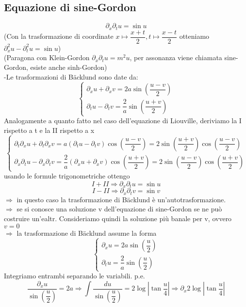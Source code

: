 \documentclass[a4paper,11pt]{report}
\newcommand{\Backlund}{B{\"a}cklund }
\begin{document}
\subsection{Equazione di sine-Gordon}
$$
\partial_x\partial_t u = \sin u
$$
(Con la trasformazione di coordinate $x \mapsto \dfrac{x+t}{2}, t\mapsto\dfrac{x-t}{2}$ otteniamo $\partial_x^2 u - \partial_t^2 u = \sin u$)\\
(Paragona con Klein-Gordon $\partial_x\partial_t u = m^2 u$, per assonanza viene chiamata sine-Gordon, esiste anche sinh-Gordon)\\
-Le trasformazioni di \Backlund sono date da:
$$
\left\{
\begin{matrix}
\partial_x u + \partial_x v = 2a \sin\left(\dfrac{u-v}{2}\right) \\
\partial_t u - \partial_t v = \dfrac{2}{a} \sin\left(\dfrac{u+v}{2}\right)
\end{matrix}
\right.
$$
Analogamente a quanto fatto nel caso dell'equazione di Liouville, deriviamo la I rispetto a t e la II rispetto a x
$$
\left\{
\begin{matrix}
\partial_t\partial_x u + \partial_t\partial_x v = a (\partial_t u - \partial_t v)\cos\left(\dfrac{u-v}{2}\right)=2\sin \left(\dfrac{u+v}{2}\right) \cos \left(\dfrac{u-v}{2}\right) \\
\partial_x\partial_t u - \partial_x\partial_t v = \dfrac{2}{a}(\partial_x u + \partial_x v)\cos\left(\dfrac{u+v}{2}\right)=2\sin\left(\dfrac{u-v}{2}\right)\cos\left(\dfrac{u+v}{2}\right)
\end{matrix}
\right.
$$
usando le formule trigonometriche ottengo
$$
I + II \Rightarrow \partial_x\partial_t u = \sin u
$$
$$
I-II \Rightarrow \partial_x\partial_t v=\sin v
$$
$\Rightarrow$ in questo caso la trasformazione di \Backlund è un'autotrasformazione.\\
$\Rightarrow$ se si conosce una soluzione v dell'equazione di sine-Gordon se ne può costruire un'ealtr. Consideriamo quindi la soluzione più banale per v, ovvero $v=0$\\
$\Rightarrow$ la trasformazione di \Backlund assume la forma
$$
\left\{
\begin{matrix}
\partial_x u = 2a\sin\left(\dfrac{u}{2}\right) \\
\partial_t u = \dfrac{2}{a}\sin\left(\dfrac{u}{2}\right)
\end{matrix}
\right.
$$
Integriamo entrambi separando le variabili. p.e.
$$
\dfrac{\partial_x u }{\sin\left(\dfrac{u}{2}\right)}=2a \Rightarrow \int\dfrac{du}{\sin\left(\dfrac{u}{2}\right)}=2\log\left|\tan\dfrac{u}{4}\right| \Rightarrow \partial_x 2\log \left| \tan \dfrac{u}{4}\right|
$$
\end{document}
